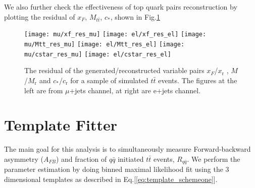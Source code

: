 \documentclass{cmspaperpdf}
\begin{document}
We also further check the effectiveness of top quark pairs reconstruction by plotting the residual of $x_F$, $M_{t\bar{t}}$, $c_*$, shown in Fig.\ref{fig:reco_res}
\begin{figure}[hbt]
  \begin{center}
    \texttt{[image: mu/xf\_res\_mu]}
    \texttt{[image: el/xf\_res\_el]}   
    \texttt{[image: mu/Mtt\_res\_mu]}
    \texttt{[image: el/Mtt\_res\_el]}
    \texttt{[image: mu/cstar\_res\_mu]}
    \texttt{[image: el/cstar\_res\_el]}
  \caption{\small The residual of the generated/reconstructed variable pairs $x_F$/$x_\mathrm{r}$ , $M$/$M_\mathrm{r}$ and $c_*$/$c_\mathrm{r}$ for a sample of simulated $t\bar t$ events. The figures at the left are from $\mu$+jets channel, at right are e+jets channel.}
    \label{fig:reco_res}
  \end{center}
\end{figure}


\clearpage
\section{Template Fitter}
\label{sec:fitter}
The main goal for this analysis is to simultaneously measure Forward-backward asymmetry ($A_{FB}$) and fraction of $q\bar{q}$ initiated $t\bar{t}$ events, $R_{q\bar{q}}$. We perform the parameter estimation by doing binned maximal likelihood fit using the 3 dimensional templates as described in Eq.[\ref{eq:template_schemeone}].  
\end{document}
